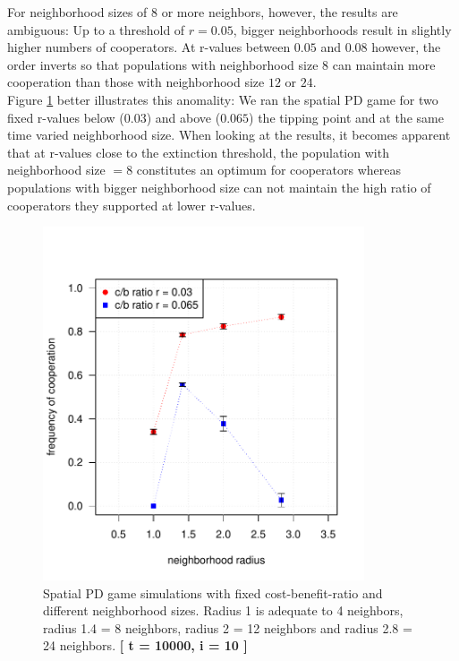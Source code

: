 For neighborhood sizes of $8$ or more neighbors, however, the results are ambiguous: Up to a threshold of $r=0.05$, bigger neighborhoods result in slightly higher numbers of cooperators. At r-values between $0.05$ and $0.08$ however, the order inverts so that populations with neighborhood size $8$ can maintain more cooperation than those with neighborhood size $12$ or $24$. \\ 
Figure \ref{fig: task2_radiusplot} better illustrates this anomality: We ran the spatial PD game for two fixed r-values below ($0.03$) and above ($0.065$) the tipping point and at the same time varied neighborhood size. When looking at the results, it becomes apparent that at r-values close to the extinction threshold, the population with neighborhood size $=8$ constitutes an optimum for cooperators whereas populations with bigger neighborhood size can not maintain the high ratio of cooperators they supported at lower r-values.


\begin{figure}[H]
	\centering 
	\includegraphics[width=9.5cm]{task2_radiusplot}
	\caption{Spatial PD game simulations with fixed cost-benefit-ratio and different neighborhood sizes. Radius 1 is adequate to 4 neighbors, radius 1.4 = 8 neighbors, radius 2 = 12 neighbors and radius 2.8 = 24 neighbors.  \textbf{[ t = 10000, i = 10 ]} }\label{fig: task2_radiusplot}
\end{figure}




